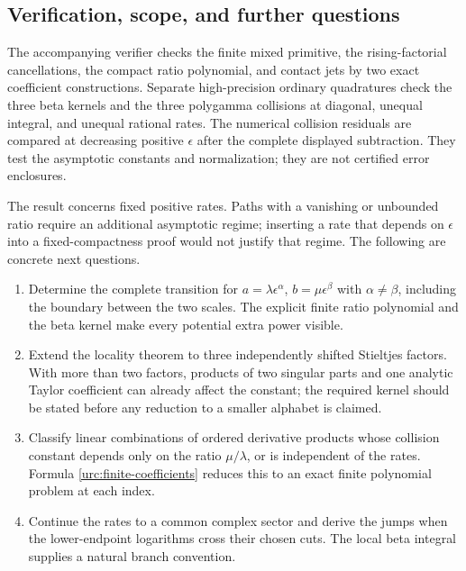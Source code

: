 \documentclass[11pt,a4paper]{article}
\theoremstyle{definition}
\theoremstyle{remark}
\numberwithin{equation}{section}
\begin{document}
\subsection{Verification, scope, and further questions}

The accompanying verifier checks the finite mixed primitive,
the rising-factorial cancellations, the compact ratio polynomial,
and contact jets by two exact coefficient constructions. Separate
high-precision ordinary quadratures check the three beta kernels
and the three polygamma collisions at diagonal, unequal integral,
and unequal rational rates. The numerical collision residuals are
compared at decreasing positive $\epsilon$ after the complete
displayed subtraction. They test the asymptotic constants and
normalization; they are not certified error enclosures.

The result concerns fixed positive rates. Paths with a vanishing or
unbounded ratio require an additional asymptotic regime; inserting
a rate that depends on $\epsilon$ into a fixed-compactness proof
would not justify that regime. The following are concrete next
questions.
\begin{enumerate}
\item Determine the complete transition for
$a=\lambda\epsilon^\alpha$, $b=\mu\epsilon^\beta$ with
$\alpha\ne\beta$, including the boundary between the two
scales. The explicit finite ratio polynomial and the beta kernel
make every potential extra power visible.
\item Extend the locality theorem to three independently shifted
Stieltjes factors. With more than two factors, products of two
singular parts and one analytic Taylor coefficient can already
affect the constant; the required kernel should be stated before
any reduction to a smaller alphabet is claimed.
\item Classify linear combinations of ordered derivative products
whose collision constant depends only on the ratio $\mu/\lambda$,
or is independent of the rates. Formula \eqref{urc:finite-coefficients}
reduces this to an exact finite polynomial problem at each index.
\item Continue the rates to a common complex sector and derive
the jumps when the lower-endpoint logarithms cross their chosen
cuts. The local beta integral supplies a natural branch convention.
\end{enumerate}


\end{document}
